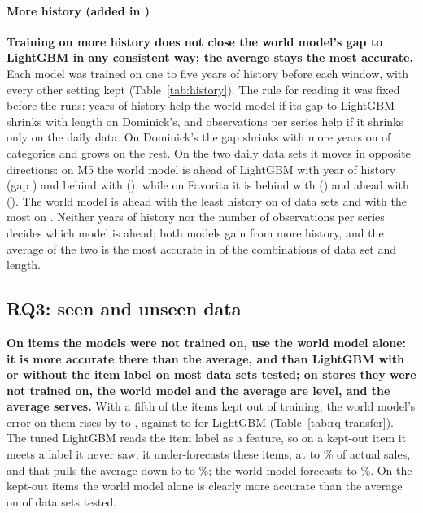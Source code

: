 \paragraph{More history (added in \thisrev{})}
\textbf{Training on more history does not close the world model's gap to
LightGBM in any consistent way; the average stays the most accurate.} Each
model was trained on one to five years of history before each window, with every
other setting kept (Table~\ref{tab:history}). The rule for reading it was fixed
before the runs: years of history help the world model if its gap to LightGBM
shrinks with length on Dominick's, and observations per series help if it shrinks
only on the daily data. On Dominick's the gap shrinks with more years on
\histDomShrinks{} of \histDomSets{} categories and grows on the rest. On the two
daily data sets it moves in opposite directions: on M5 the world model is ahead
of LightGBM with \histMfiveYearsShort{} year of history (gap \histMfiveGapShort) and
behind with \histMfiveYearsLong{} (\histMfiveGapLong), while on Favorita it is behind
with \histFavYearsShort{} (\histFavGapShort) and ahead with \histFavYearsLong{}
(\histFavGapLong). The world model is ahead with the least history on
\histAheadShort{} of \histSets{} data sets and with the most on \histAheadLong. Neither
years of history nor the number of observations per series decides which model
is ahead; both models gain from more history, and the average of the two is the
most accurate in \histAvgBest{} of the \histCells{} combinations of data set and
length.



\subsection{RQ3: seen and unseen data}
\label{sec:rq-unseen}

\textbf{On items the models were not trained on, use the world model alone: it is
more accurate there than the average, and than LightGBM with or without the item
label on most data sets tested; on
stores they were not trained on, the world model and the average are level, and
the average serves.} With a fifth of the items
kept out of training, the world model's error on them rises by \rqCostWmItemLo{} to \rqCostWmItemHi{},
against \rqCostLgbItemLo{} to \rqCostLgbItemHi{} for LightGBM (Table~\ref{tab:rq-transfer}). The tuned
LightGBM reads the item label as a feature, so on a kept-out item it meets a label
it never saw; it under-forecasts these items, at \rqFaLgbItemLo{} to \rqFaLgbItemHi{}\% of actual sales, and that pulls the
average down to \rqFaAvgItemLo{} to \rqFaAvgItemHi{}\%; the world model forecasts \rqFaWmItemLo{} to \rqFaWmItemHi{}\%. On the kept-out
items the world model alone is clearly more accurate than the average on \rqItemWmBeatsAvg{} of \rqKeptSets{}
data sets tested.

